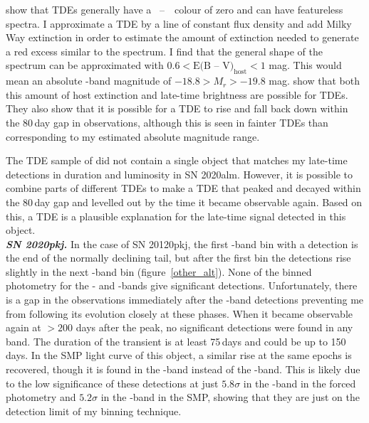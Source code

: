 \documentclass[a4paper,oneside,12pt, class=Latex/Classes/PhDthesisPSnPDF, crop=false]{standalone}
\begin{document}
\citet{TDE_host_ext_range} show that TDEs generally have a \ztfg~--~\ztfr~colour of zero and can have featureless spectra. I approximate a TDE by a line of constant flux density and add Milky Way extinction \citep[using the SFD89 dust maps in the direction of the object;][]{SFD98_dust_maps} in order to estimate the amount of extinction needed to generate a red excess similar to the spectrum. I find that the general shape of the spectrum can be approximated with $0.6 < \text{E(B -- V)}_\text{host} < 1$ mag. This would mean an absolute \ztfr-band magnitude of $-18.8 > M_r > -19.8$ mag. \citet{TDE_host_ext_range} show that both this amount of host extinction and late-time brightness are possible for TDEs. They also show that it is possible for a TDE to rise and fall back down within the 80\,day gap in observations, although this is seen in fainter TDEs than corresponding to my estimated absolute magnitude range.

The TDE sample of \citet{TDE_host_ext_range} did not contain a single object that matches my late-time detections in duration and luminosity in SN 2020alm. However, it is possible to combine parts of different TDEs to make a TDE that peaked and decayed within the 80\,day gap and levelled out by the time it became observable again. Based on this, a TDE is a plausible explanation for the late-time signal detected in this object.\\


\textit{\textbf{SN 2020pkj.}}
In the case of SN 20120pkj, the first \ztfr-band bin with a detection is the end of the normally declining tail, but after the first bin the detections rise slightly in the next \ztfr-band bin (figure~\ref{other_alt}). None of the binned photometry for the \ztfg- and \ztfi-bands give significant detections. Unfortunately, there is a gap in the observations immediately after the \ztfr-band detections preventing me from following its evolution closely at these phases. When it became observable again at $>200$ days after the peak, no significant detections were found in any band. The duration of the transient is at least 75\,days and could be up to 150 days. In the SMP light curve of this object, a similar rise at the same epochs is recovered, though it is found in the \ztfg-band instead of the \ztfr-band. This is likely due to the low significance of these detections at just $5.8\sigma$ in the \ztfr-band in the forced photometry and $5.2\sigma$ in the \ztfg-band in the SMP, showing that they are just on the detection limit of my binning technique.
\end{document}
